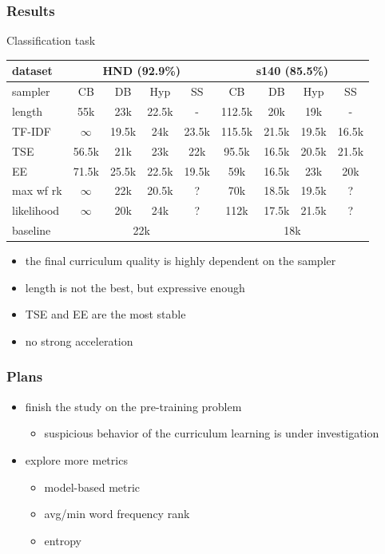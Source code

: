 \documentclass{beamer}
\begin{document}
\begin{frame}
	\frametitle{Results}
	Classification task
	\begin{table}
		\begin{tabular}{l|cccc|cccc}
			dataset & \multicolumn{4}{c}{HND (92.9\%)} & \multicolumn{4}{c}{s140 (85.5\%)}\\
			\hline
			sampler & CB & DB & Hyp & SS & CB & DB & Hyp & SS \\
			\hline
			length & 55k & 23k & 22.5k & - & 112.5k & 20k & 19k & -\\
			TF-IDF & $\infty$ & 19.5k & 24k & 23.5k & 115.5k & 21.5k & 19.5k & 16.5k \\
			TSE & 56.5k & 21k & 23k & 22k & 95.5k & 16.5k & 20.5k & 21.5k\\
			EE & 71.5k & 25.5k & 22.5k & 19.5k & 59k & 16.5k & 23k & 20k \\
			max wf rk & $\infty$ & 22k & 20.5k & ? & 70k & 18.5k & 19.5k & ? \\
			likelihood & $\infty$ & 20k & 24k & ? & 112k & 17.5k & 21.5k & ?\\
			\hline
			baseline & \multicolumn{4}{c}{22k} & \multicolumn{4}{c}{18k}
		\end{tabular}
	\end{table}
	\begin{itemize}
		\item the final curriculum quality is highly dependent on the sampler
		\item length is not the best, but expressive enough
		\item TSE and EE are the most stable
		\item no strong acceleration
	\end{itemize}
\end{frame}

\begin{frame}
	\frametitle{Plans}
	\begin{itemize}
		\item finish the study on the pre-training problem
			\begin{itemize}
				\item suspicious behavior of the curriculum learning is under investigation
			\end{itemize}
		\item explore more metrics
			\begin{itemize}
				\item model-based metric
				\item avg/min word frequency rank
				\item entropy
			\end{itemize}
	\end{itemize}
\end{frame}
\end{document}
